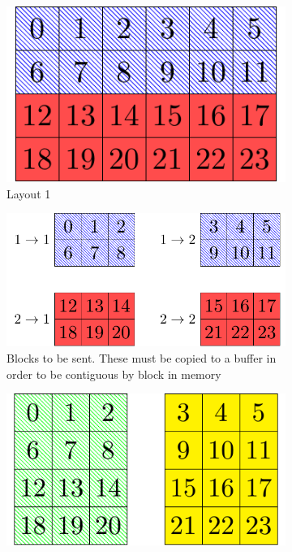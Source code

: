 \begin{figure}[ht]
 \begin{center}
 \begin{subfigure}[t]{0.4\textwidth}
  \centering
  \includegraphics[width=\textwidth]{Figs/SplitConcat2D/Layout1}
  \caption{\label{fig::SplitConcat layout1}Layout 1}
 \end{subfigure}
 \hspace{0.05\textwidth}
 \begin{subfigure}[t]{0.5\textwidth}
  \centering
  \includegraphics[width=\textwidth]{Figs/SplitConcat2D/SendBlocks}
  \caption{\label{fig::SplitConcat send blocks}Blocks to be sent. These must be copied to a buffer in order to be contiguous by block in memory}
 \end{subfigure}
 \begin{subfigure}[t]{0.5\textwidth}
  \centering
  \includegraphics[width=\textwidth]{Figs/SplitConcat2D/RecvLayout}

\end{subfigure}
\end{center}
\end{figure}
